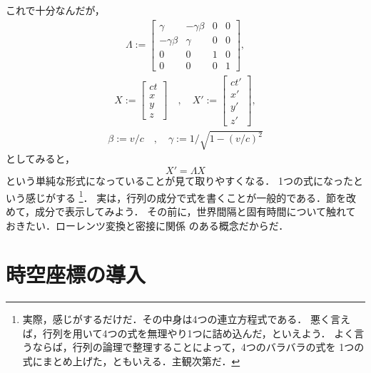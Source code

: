     これで十分なんだが，
    \begin{align}\label{eq:Lorentz_trans_by_matrix}
        \Lambda :=
        \begin{bmatrix}
              \gamma       & - \gamma \beta & 0 & 0 \\
            - \gamma \beta &   \gamma       & 0 & 0 \\
            0              & 0              & 1 & 0 \\
            0              & 0              & 0 & 1
        \end{bmatrix},
    \end{align}
    \begin{align}
        X :=
        \begin{bmatrix}
            ct\\
            x \\
            y \\
            z
        \end{bmatrix}\quad,\quad
        X' :=
        \begin{bmatrix}
                ct'\\
                x' \\
                y' \\
                z'
        \end{bmatrix},
    \end{align}
    \begin{align}
        \beta := v/c \quad,\quad \gamma := 1/\sqrt{1-(v/c)^{2}}
    \end{align}
    としてみると，
        \[
            X' = \Lambda X
        \]
    という単純な形式になっていることが見て取りやすくなる．
    1つの式になったという感じがする
        \footnote{
            実際，感じがするだけだ．その中身は4つの連立方程式である．
            悪く言えば，行列を用いて4つの式を無理やり1つに詰め込んだ，といえよう．
            よく言うならば，行列の論理で整理することによって，4つのバラバラの式を
            1つの式にまとめ上げた，ともいえる．主観次第だ．
        }．
    実は，行列の成分で式を書くことが一般的である．節を改めて，成分で表示してみよう．
    その前に，世界間隔と固有時間について触れておきたい．ローレンツ変換と密接に関係
    のある概念だからだ．

\section{時空座標の導入}
